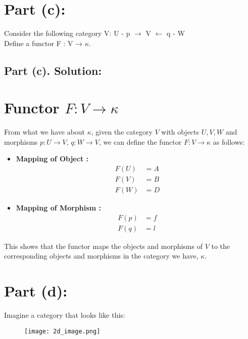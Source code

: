 \documentclass{article}
\begin{document}
\newpage

\section*{Part (c):} Consider the following category V:
U - p $\rightarrow$ V $\leftarrow$ q - W \\
Define a functor F : V → $\kappa$.


\subsection*{Part (c). Solution:}

\section*{Functor \(F: V \to \kappa\)}

From what we have about $\kappa$, given the category \(V\) with objects \(U, V, W\) and morphisms \(p: U \to V\), \(q: W \to V\), 
we can define the functor \(F: V \to \kappa\) as follows:

\begin{itemize}
    \item \textbf{Mapping of Object :}
    \begin{align*}
    F(U) &= A \\
    F(V) &= B \\
    F(W) &= D
    \end{align*}

    \item \textbf{Mapping of Morphism :}
    \begin{align*}
    F(p) &= f \\
    F(q) &= l
    \end{align*}
\end{itemize}

This shows that the functor maps the objects and morphisms of \(V\) 
to the corresponding objects and morphisms in the category we have, \(\kappa\).

\newpage

\section*{Part (d):} Imagine a category that looks like this:
\begin{figure}[h!]
    \centering
    \texttt{[image: 2d\_image.png]} %
    \label{fig:sample-image}
\end{figure} 
\end{document}
